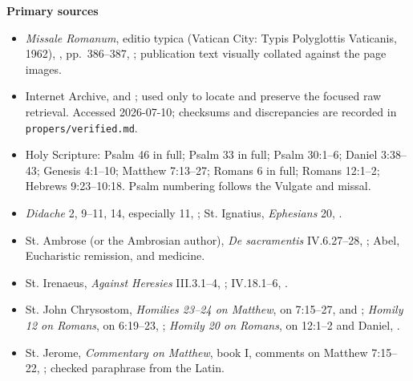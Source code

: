 \begin{deepstudy}
\textbf{Primary sources}
{\footnotesize
\begin{itemize}[itemsep=0em,topsep=0.15em,parsep=0pt]
\item \emph{Missale Romanum}, editio typica (Vatican City: Typis Polyglottis Vaticanis, 1962), , pp.~386--387, ; publication text visually collated against the page images.
\item Internet Archive,  and ; used only to locate and preserve the focused raw retrieval. Accessed 2026-07-10; checksums and discrepancies are recorded in \texttt{propers/verified.md}.
\item Holy Scripture: Psalm 46 in full; Psalm 33 in full; Psalm 30:1--6; Daniel 3:38--43; Genesis 4:1--10; Matthew 7:13--27; Romans 6 in full; Romans 12:1--2; Hebrews 9:23--10:18. Psalm numbering follows the Vulgate and missal.
\item \emph{Didache} 2, 9--11, 14, especially 11, ; St. Ignatius, \emph{Ephesians} 20, .
\item St. Ambrose (or the Ambrosian author), \emph{De sacramentis} IV.6.27--28, ; Abel, Eucharistic remission, and medicine.
\item St. Irenaeus, \emph{Against Heresies} III.3.1--4, ; IV.18.1--6, .
\item St. John Chrysostom, \emph{Homilies 23--24 on Matthew}, on 7:15--27,  and ; \emph{Homily 12 on Romans}, on 6:19--23, ; \emph{Homily 20 on Romans}, on 12:1--2 and Daniel, .
\item St. Jerome, \emph{Commentary on Matthew}, book I, comments on Matthew 7:15--22, ; checked paraphrase from the Latin.

\end{itemize}}
\end{deepstudy}
